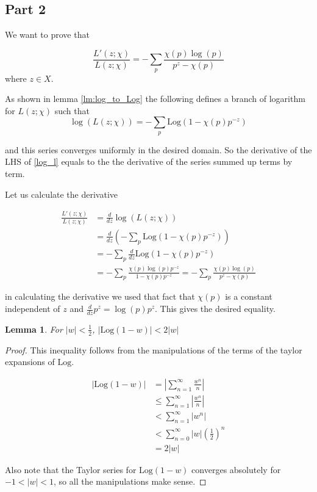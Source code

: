 \documentclass{article}
\newtheorem{lemma}[theorem]{Lemma}
\theoremstyle{definition}
\theoremstyle{definition}
\theoremstyle{remark}
\newcommand{\Log}{\text{Log}}
\begin{document}
\subsection{Part 2}

We want to prove that 

\begin{equation}
	\frac{L'(z; \chi)}{L(z; \chi)} = - \sum_p \frac{\chi(p) \log(p)}{p^z - \chi(p)}
\end{equation}
where $z \in X$.

As shown in lemma \ref{lm:log_to_Log} the following defines a branch of logarithm for $L(z; \chi)$ such that 
\begin{equation}\label{log_l}
\log(L(z; \chi)) = - \sum_p \Log(1-\chi(p)p^{-z})
\end{equation}

and this series converges uniformly in the desired domain.
So the derivative of the LHS of \ref{log_l} equals to the the derivative of the series summed up terms by term. 

Let us calculate the derivative 

\begin{align}
	\frac{L'(z; \chi)}{L(z; \chi)}
	&=\frac{d}{dz} \log(L(z; \chi)) 
	\\&= \frac{d}{dz} \left(- \sum_p \Log(1-\chi(p)p^{-z})\right) 
	\\&=  - \sum_p  \frac{d}{dz} \Log(1-\chi(p)p^{-z}) 
	\\&=  - \sum_p \frac{\chi(p) \log(p) p^{-z}}{1-\chi(p) p^{-z}} 
	= - \sum_p \frac{\chi(p) \log(p)}{p^z - \chi(p)}
\end{align}

in calculating the derivative we used that fact that $\chi(p)$ is a constant independent of $z$ and $\frac{d}{dz}p^{z} = \log(p) p^z$.
This gives the desired equality.

\begin{lemma}\label{log_ineq}
	For $|w| < \frac{1}{2}$, $|\Log(1 - w)| < 2|w|$
\end{lemma}

\begin{proof}
	This inequality follows from the manipulations of the terms of the taylor expansions of $\Log$. 

	\begin{align}
		|\Log(1-w)| 
		&= \left|\sum_{n=1}^{\infty}\frac{w^n}{n}\right| \\
		&\leq \sum_{n=1}^{\infty}\left|\frac{w^n}{n}\right| \\
		&< \sum_{n=1}^{\infty}\left|w^n\right| \\
		&< \sum_{n=0}^{\infty}|w|(\frac{1}{2})^n \\
		&= 2 |w|
	\end{align}

	Also note that the Taylor series for $\Log(1-w)$ converges absolutely for $-1< |w| < 1$, so all the manipulations make sense.
\end{proof}
\end{document}
